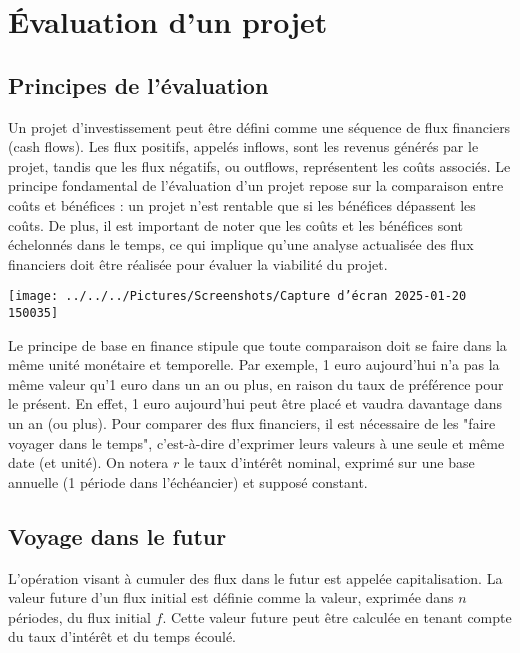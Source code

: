 \documentclass[a4paper, 12pt]{report}
\begin{document}
\chapter{Évaluation d’un projet}

\section{Principes de l’évaluation}

Un projet d'investissement peut être défini comme une séquence de flux financiers (cash flows). Les flux positifs, appelés inflows, sont les revenus générés par le projet, tandis que les flux négatifs, ou outflows, représentent les coûts associés. Le principe fondamental de l'évaluation d'un projet repose sur la comparaison entre coûts et bénéfices : un projet n'est rentable que si les bénéfices dépassent les coûts. De plus, il est important de noter que les coûts et les bénéfices sont échelonnés dans le temps, ce qui implique qu'une analyse actualisée des flux financiers doit être réalisée pour évaluer la viabilité du projet.

\begin{center}
	\texttt{[image: ../../../Pictures/Screenshots/Capture d'écran 2025-01-20 150035]}
\end{center}

Le principe de base en finance stipule que toute comparaison doit se faire dans la même unité monétaire et temporelle. Par exemple, 1 euro aujourd'hui n'a pas la même valeur qu'1 euro dans un an ou plus, en raison du taux de préférence pour le présent. En effet, 1 euro aujourd'hui peut être placé et vaudra davantage dans un an (ou plus). Pour comparer des flux financiers, il est nécessaire de les "faire voyager dans le temps", c'est-à-dire d'exprimer leurs valeurs à une seule et même date (et unité). On notera \( r \) le taux d'intérêt nominal, exprimé sur une base annuelle (1 période dans l'échéancier) et supposé constant.

\section{Voyage dans le futur}

L'opération visant à cumuler des flux dans le futur est appelée capitalisation. La valeur future d'un flux initial est définie comme la valeur, exprimée dans \( n \) périodes, du flux initial \( f \). Cette valeur future peut être calculée en tenant compte du taux d'intérêt et du temps écoulé.
\end{document}
